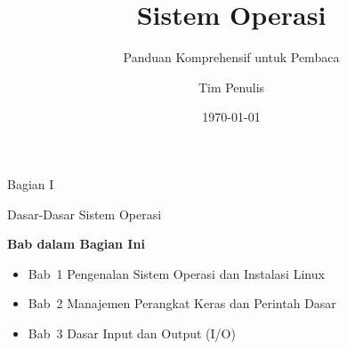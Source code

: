 \documentclass[
    paper=23cm:15.5cm,   %
    11pt,               %
    twoside,            %
    openany,            %
    bibliography=totoc, %
]{scrbook}            %
\title{Sistem Operasi}
\subtitle{Panduan Komprehensif untuk Pembaca}
\author{Tim Penulis}
\date{\today}
\begin{document}
\frontmatter









\renewcommand{\contentsname}{Daftar Isi}
\tableofcontents



\mainmatter

\vspace*{4cm}
{\fontsize{28}{34}\sffamily\bfseries\raggedright Bagian I\par}
\vspace{6pt}
{\fontsize{22}{28}\sffamily\bfseries\raggedright Dasar-Dasar Sistem Operasi\par}
\vspace{16pt}
{\large\sffamily\bfseries Bab dalam Bagian Ini}\par
\vspace{6pt}
\begin{itemize}[topsep=0pt, itemsep=2pt]
  \item Bab~1 \textbullet{} Pengenalan Sistem Operasi dan Instalasi Linux
  \item Bab~2 \textbullet{} Manajemen Perangkat Keras dan Perintah Dasar
  \item Bab~3 \textbullet{} Dasar Input dan Output (I/O)
\end{itemize}
\newpage




\end{document}
